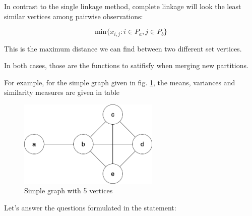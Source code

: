 \documentclass[12pt,a4paper]{article}
\begin{document}
In contrast to the single linkage method, complete linkage will look
the least similar vertices among pairwise observations:

$$ \mathrm{min}\{x_{i,j} : i \in P_a, j \in P_b\} $$

This is the maximum distance we can find between two different set
vertices.

In both cases, those are the functions to satifisfy when merging new
partitions.




For example, for the simple graph given in
fig. \ref{fig:simple_graph}, the means, variances and similarity
measures are given in table

\begin{figure}[ht!]
  \centering
  \includegraphics[width=0.6\textwidth]{img/simple_graph.png}
  \caption{Simple graph with 5 vertices}
  \label{fig:simple_graph}
\end{figure}

Let's answer the questions formulated in the statement:
\end{document}
